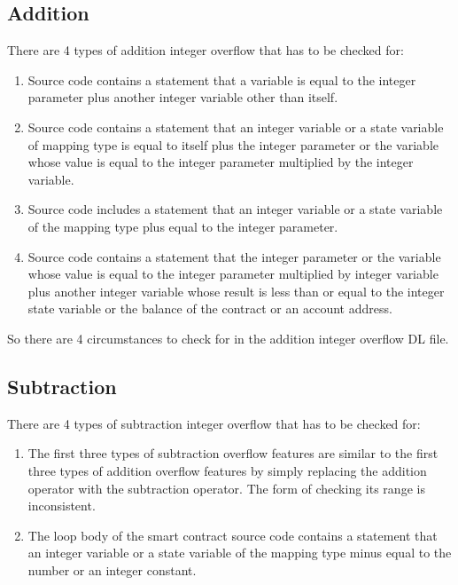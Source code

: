 \documentclass{article}
\begin{document}
\subsection{Addition}
There are 4 types of addition integer overflow that has to be checked for:
\begin{enumerate}
    \item Source code contains a statement that a variable is equal to the integer parameter plus another integer variable other than itself.
    \item Source code contains a statement that an integer variable or a state variable of mapping type is equal to itself plus the integer parameter or the variable whose value is equal to the integer parameter multiplied by the integer variable.
    \item Source code includes a statement that an integer variable or a state variable of the mapping type plus equal to the integer parameter.
    \item Source code contains a statement that the integer parameter or the variable whose value is equal to the integer parameter multiplied by integer variable plus another integer variable whose result is less than or equal to the integer state variable or the balance of the contract or an account address.
\end{enumerate}
So there are 4 circumstances to check for in the addition integer overflow DL file.
\subsection{Subtraction}
There are 4 types of subtraction integer overflow that has to be checked for:
\begin{enumerate}
    \item The first three types of subtraction overflow features are similar to the first three types of addition overflow features by simply replacing the addition operator with the subtraction operator. The form of checking its range is inconsistent.
    \item The loop body of the smart contract source code contains a statement that an integer variable or a state variable of the mapping type minus equal to the number or an integer constant.
\end{enumerate}
\end{document}
